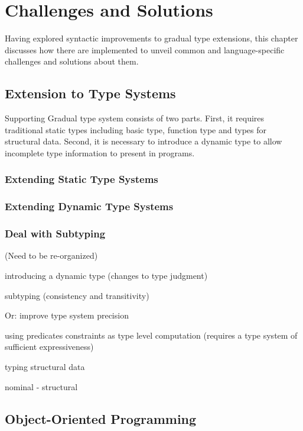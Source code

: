 
\renewcommand{\thechapter}{3}

\chapter{Challenges and Solutions}

Having explored syntactic improvements to gradual type extensions,
this chapter discusses how there are implemented to unveil common and language-specific
challenges and solutions about them.

\section{Extension to Type Systems}

Supporting Gradual type system consists of two parts.
First, it requires traditional static types including basic type, function type and types for structural data.
Second, it is necessary to introduce a dynamic type to allow incomplete type information to present in programs.

\subsection{Extending Static Type Systems}

\subsection{Extending Dynamic Type Systems}

\subsection{Deal with Subtyping}

(Need to be re-organized)

introducing a dynamic type (changes to type judgment)

subtyping (consistency and transitivity)

Or: improve type system precision

using predicates
constraints as type level computation (requires a type system of sufficient expressiveness)

typing structural data

nominal
- structural

\section{Object-Oriented Programming}

